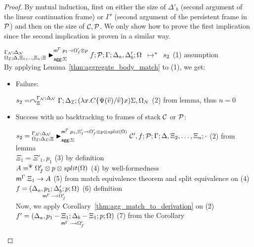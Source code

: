 \begin{proof}
By mutual induction, first on either the size of $\Delta'_b$ (second argument of
the linear continuation frame) or $\Gamma'$ (second argument of the
persistent frame in $\lstack{P}$) and then on the size of $\lstack{C},
\lstack{P}$.  We only show how to prove the first implication since the
second implication is proven in a similar way.

$\transs{\matstatea{\Delta, \Xi_1, \dotsc, \Xi_n}{f; \lstack{P}}{\Gamma}{\Delta_a,
      \Delta'_b}{\Omega}{p_1 \rightarrow \Omega'_f \otimes p}{\Sigma}}{s_2}$
         \hfill (1) assumption\\

By applying Lemma~\ref{thm:aggregate_body_match} to (1), we get:

\begin{itemize}[leftmargin=*]
   \item Failure:
   
   $s_2 = \derstatex{\Gamma}{\deltan}{\Xi}{\gammanew}{\deltanew}
{(\lambda x.  C\{\Psi(\widehat{v})/\widehat{v}\} x) \Sigma,
   \Omega_N}$ \hfill (2) from lemma, thus $n = 0$\\
   
   \item Success with no backtracking to frames of stack $\lstack{C}$ or
   $\lstack{P}$:
   
      $s_2 = \matstatea{\deltan}{\lstack{C'}, f; \lstack{P}}{\Gamma}
         {\Delta, \Xi_2, \dotsc, \Xi_n}{\cdot}{p_1, \Xi'_1 \rightarrow \Omega'_f \otimes p
                                \otimes split(\Omega)}{\Sigma}$ \hfill (2) from
                                lemma \\
      $\Xi_1 = \Xi'_1, p_1$ \hfill (3) by definition \\

      $\feqa{A}{\Omega'_f \otimes p \otimes split(\Omega)}{\Psi}{\Psi}$ \hfill (4) by
      well-formedness \\
      $\mz{\Gamma}{\Xi_1}{A}$ \hfill (5) from match equivalence
      theorem and split equivalence on (4) \\

      $f = \lframe{\Delta_a, p_1}{\Delta'_b}{p}{\Omega}{\cdot}{\Omega'_f}$
      \hfill (6) definition \\

      Now, we apply Corollary~\ref{thm:agg_match_to_derivation} on (2) \\

      $f' = \lframe{\Delta_a, p_1 - \Xi_1}{\Delta_b -
         \Xi_1}{p}{\Omega}{\cdot}{\Omega'_f}$ \hfill (7) from the Corollary \\



\end{itemize}
\end{proof}
